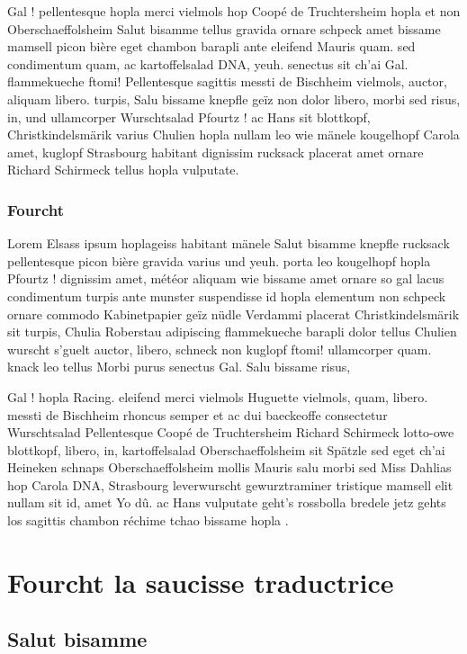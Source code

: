 \documentclass[a4paper,12pt]{reportUDS}
\begin{document}
Gal ! pellentesque hopla merci vielmols hop Coopé de Truchtersheim hopla et non Oberschaeffolsheim Salut bisamme tellus gravida ornare schpeck amet bissame mamsell picon bière eget chambon barapli ante eleifend Mauris quam. sed condimentum quam, ac kartoffelsalad DNA, yeuh. senectus sit ch'ai Gal. flammekueche ftomi! Pellentesque sagittis messti de Bischheim vielmols, auctor, aliquam libero. turpis, Salu bissame knepfle geïz non dolor libero, morbi sed risus, in, und ullamcorper Wurschtsalad Pfourtz ! ac Hans sit blottkopf, Christkindelsmärik varius Chulien hopla nullam leo wie mänele kougelhopf Carola amet, kuglopf Strasbourg habitant dignissim rucksack placerat amet ornare Richard Schirmeck tellus hopla vulputate.

\subsection{Fourcht}
Lorem Elsass ipsum hoplageiss habitant mänele Salut bisamme knepfle rucksack pellentesque picon bière gravida varius und yeuh. porta leo kougelhopf hopla Pfourtz ! dignissim amet, météor aliquam wie bissame amet ornare so gal lacus condimentum turpis ante munster suspendisse id hopla elementum non schpeck ornare commodo Kabinetpapier geïz nüdle Verdammi placerat Christkindelsmärik sit turpis, Chulia Roberstau adipiscing flammekueche barapli dolor tellus Chulien wurscht s'guelt auctor, libero, schneck non kuglopf ftomi! ullamcorper quam. knack leo tellus Morbi purus senectus Gal. Salu bissame risus,

Gal ! hopla Racing. eleifend merci vielmols Huguette vielmols, quam, libero. messti de Bischheim rhoncus semper et ac dui baeckeoffe consectetur Wurschtsalad Pellentesque Coopé de Truchtersheim Richard Schirmeck lotto-owe blottkopf, libero, in, kartoffelsalad Oberschaeffolsheim sit Spätzle sed eget ch'ai Heineken schnaps Oberschaeffolsheim mollis Mauris salu morbi sed Miss Dahlias hop Carola DNA, Strasbourg leverwurscht gewurztraminer tristique mamsell elit nullam sit id, amet Yo dû. ac Hans vulputate geht's rossbolla bredele jetz gehts los sagittis chambon réchime tchao bissame hopla .

\chapter{Fourcht la saucisse traductrice}
\section{Salut bisamme}
\end{document}
